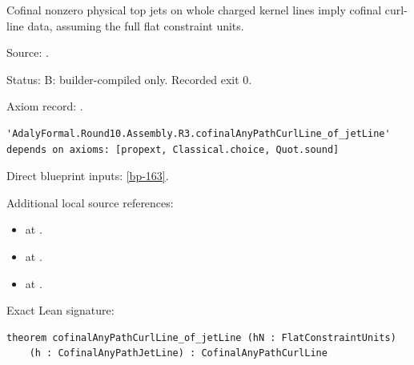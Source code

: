 \begin{theorem}[bp-165]
\label{bp-165}
\leanok
Cofinal nonzero physical top jets on whole charged kernel lines imply cofinal curl-line data, assuming the full flat constraint units.

\par Source: \texttt{}.
\par Status: B: builder-compiled only. Recorded exit 0.
\par Axiom record: \texttt{}.
\begin{verbatim}
'AdalyFormal.Round10.Assembly.R3.cofinalAnyPathCurlLine_of_jetLine' depends on axioms: [propext, Classical.choice, Quot.sound]
\end{verbatim}
\par Direct blueprint inputs: \ref{bp-163}.
\par Additional local source references:
\begin{itemize}
\item \texttt{} at \texttt{}.
\item \texttt{} at \texttt{}.
\item \texttt{} at \texttt{}.
\end{itemize}
\par Exact Lean signature:
\begin{verbatim}
theorem cofinalAnyPathCurlLine_of_jetLine (hN : FlatConstraintUnits)
    (h : CofinalAnyPathJetLine) : CofinalAnyPathCurlLine
\end{verbatim}
\end{theorem}

